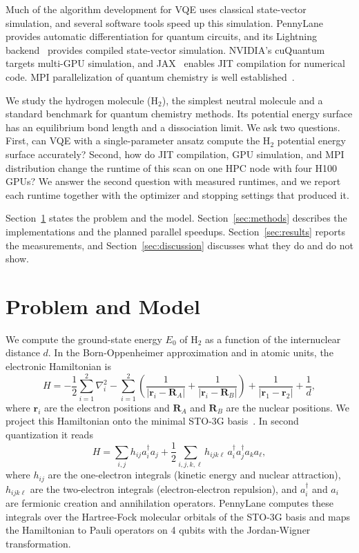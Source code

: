 \documentclass[11pt]{article}
\begin{document}
Much of the algorithm development for VQE uses classical state-vector simulation, and several software tools speed up this simulation. PennyLane~\cite{bergholm2018} provides automatic differentiation for quantum circuits, and its Lightning backend~\cite{pennylane_lightning} provides compiled state-vector simulation. NVIDIA's cuQuantum~\cite{cuquantum2023} targets multi-GPU simulation, and JAX~\cite{jax2018} enables JIT compilation for numerical code. MPI parallelization of quantum chemistry is well established~\cite{valiev2010}.

We study the hydrogen molecule (H$_2$), the simplest neutral molecule and a standard benchmark for quantum chemistry methods. Its potential energy surface has an equilibrium bond length and a dissociation limit. We ask two questions. First, can VQE with a single-parameter ansatz compute the H$_2$ potential energy surface accurately? Second, how do JIT compilation, GPU simulation, and MPI distribution change the runtime of this scan on one HPC node with four H100 GPUs? We answer the second question with measured runtimes, and we report each runtime together with the optimizer and stopping settings that produced it.

Section~\ref{sec:model} states the problem and the model. Section~\ref{sec:methods} describes the implementations and the planned parallel speedups. Section~\ref{sec:results} reports the measurements, and Section~\ref{sec:discussion} discusses what they do and do not show.

\section{Problem and Model}
\label{sec:model}

We compute the ground-state energy $E_0$ of H$_2$ as a function of the internuclear distance $d$. In the Born-Oppenheimer approximation and in atomic units, the electronic Hamiltonian is
\begin{equation}
    H = -\frac{1}{2}\sum_{i=1}^{2}\nabla_i^2 - \sum_{i=1}^{2}\left(\frac{1}{|\mathbf{r}_i - \mathbf{R}_A|} + \frac{1}{|\mathbf{r}_i - \mathbf{R}_B|}\right) + \frac{1}{|\mathbf{r}_1 - \mathbf{r}_2|} + \frac{1}{d},
\end{equation}
where $\mathbf{r}_i$ are the electron positions and $\mathbf{R}_A$ and $\mathbf{R}_B$ are the nuclear positions. We project this Hamiltonian onto the minimal STO-3G basis~\cite{szabo1996}. In second quantization it reads
\begin{equation}
    H = \sum_{i,j} h_{ij} a_i^\dagger a_j + \frac{1}{2}\sum_{i,j,k,\ell} h_{ijk\ell}\, a_i^\dagger a_j^\dagger a_k a_\ell,
\end{equation}
where $h_{ij}$ are the one-electron integrals (kinetic energy and nuclear attraction), $h_{ijk\ell}$ are the two-electron integrals (electron-electron repulsion), and $a_i^\dagger$ and $a_i$ are fermionic creation and annihilation operators. PennyLane computes these integrals over the Hartree-Fock molecular orbitals of the STO-3G basis and maps the Hamiltonian to Pauli operators on 4 qubits with the Jordan-Wigner transformation.
\end{document}
